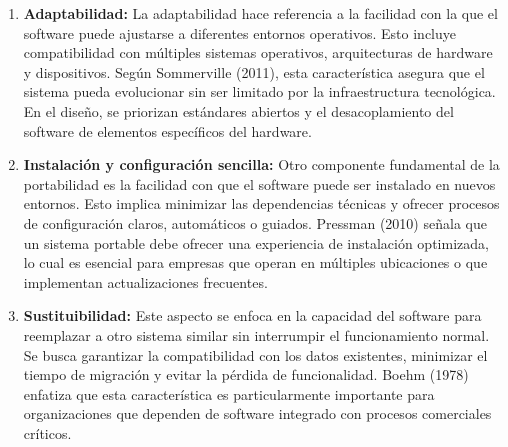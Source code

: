 		\begin{enumerate}[label=\textbf{\alph*)}, left=0cm, labelsep = 0.8cm, topsep = 0pt, parsep = 0pt] %
			\item \textbf{Adaptabilidad:} La adaptabilidad hace referencia a la facilidad con la que el software puede ajustarse a diferentes entornos operativos. Esto incluye compatibilidad con múltiples sistemas operativos, arquitecturas de hardware y dispositivos. Según Sommerville (2011), esta característica asegura que el sistema pueda evolucionar sin ser limitado por la infraestructura tecnológica. En el diseño, se priorizan estándares abiertos y el desacoplamiento del software de elementos específicos del hardware.
			\item \textbf{Instalación y configuración sencilla:} Otro componente fundamental de la portabilidad es la facilidad con que el software puede ser instalado en nuevos entornos. Esto implica minimizar las dependencias técnicas y ofrecer procesos de configuración claros, automáticos o guiados. Pressman (2010) señala que un sistema portable debe ofrecer una experiencia de instalación optimizada, lo cual es esencial para empresas que operan en múltiples ubicaciones o que implementan actualizaciones frecuentes.
			\item \textbf{Sustituibilidad:} Este aspecto se enfoca en la capacidad del software para reemplazar a otro sistema similar sin interrumpir el funcionamiento normal. Se busca garantizar la compatibilidad con los datos existentes, minimizar el tiempo de migración y evitar la pérdida de funcionalidad. Boehm (1978) enfatiza que esta característica es particularmente importante para organizaciones que dependen de software integrado con procesos comerciales críticos.
		\end{enumerate}
			
	
	
